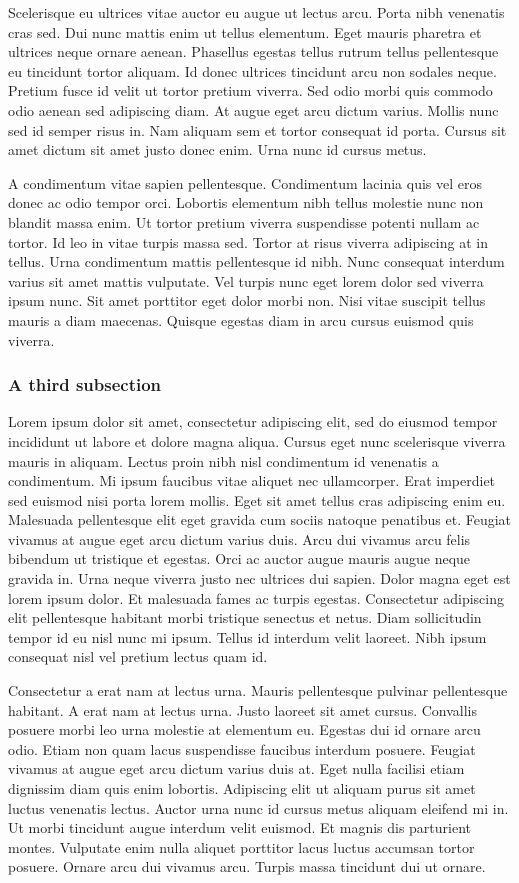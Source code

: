 \documentclass[red, openany, logo-1e]{shadowrun}
\begin{document}
Scelerisque eu ultrices vitae auctor eu augue ut lectus arcu. Porta nibh venenatis cras sed. Dui nunc mattis enim ut tellus elementum. Eget mauris pharetra et ultrices neque ornare aenean. Phasellus egestas tellus rutrum tellus pellentesque eu tincidunt tortor aliquam. Id donec ultrices tincidunt arcu non sodales neque. Pretium fusce id velit ut tortor pretium viverra. Sed odio morbi quis commodo odio aenean sed adipiscing diam. At augue eget arcu dictum varius. Mollis nunc sed id semper risus in. Nam aliquam sem et tortor consequat id porta. Cursus sit amet dictum sit amet justo donec enim. Urna nunc id cursus metus.

A condimentum vitae sapien pellentesque. Condimentum lacinia quis vel eros donec ac odio tempor orci. Lobortis elementum nibh tellus molestie nunc non blandit massa enim. Ut tortor pretium viverra suspendisse potenti nullam ac tortor. Id leo in vitae turpis massa sed. Tortor at risus viverra adipiscing at in tellus. Urna condimentum mattis pellentesque id nibh. Nunc consequat interdum varius sit amet mattis vulputate. Vel turpis nunc eget lorem dolor sed viverra ipsum nunc. Sit amet porttitor eget dolor morbi non. Nisi vitae suscipit tellus mauris a diam maecenas. Quisque egestas diam in arcu cursus euismod quis viverra.

\subsubsection{A third subsection}
Lorem ipsum dolor sit amet, consectetur adipiscing elit, sed do eiusmod tempor incididunt ut labore et dolore magna aliqua. Cursus eget nunc scelerisque viverra mauris in aliquam. Lectus proin nibh nisl condimentum id venenatis a condimentum. Mi ipsum faucibus vitae aliquet nec ullamcorper. Erat imperdiet sed euismod nisi porta lorem mollis. Eget sit amet tellus cras adipiscing enim eu. Malesuada pellentesque elit eget gravida cum sociis natoque penatibus et. Feugiat vivamus at augue eget arcu dictum varius duis. Arcu dui vivamus arcu felis bibendum ut tristique et egestas. Orci ac auctor augue mauris augue neque gravida in. Urna neque viverra justo nec ultrices dui sapien. Dolor magna eget est lorem ipsum dolor. Et malesuada fames ac turpis egestas. Consectetur adipiscing elit pellentesque habitant morbi tristique senectus et netus. Diam sollicitudin tempor id eu nisl nunc mi ipsum. Tellus id interdum velit laoreet. Nibh ipsum consequat nisl vel pretium lectus quam id.

Consectetur a erat nam at lectus urna. Mauris pellentesque pulvinar pellentesque habitant. A erat nam at lectus urna. Justo laoreet sit amet cursus. Convallis posuere morbi leo urna molestie at elementum eu. Egestas dui id ornare arcu odio. Etiam non quam lacus suspendisse faucibus interdum posuere. Feugiat vivamus at augue eget arcu dictum varius duis at. Eget nulla facilisi etiam dignissim diam quis enim lobortis. Adipiscing elit ut aliquam purus sit amet luctus venenatis lectus. Auctor urna nunc id cursus metus aliquam eleifend mi in. Ut morbi tincidunt augue interdum velit euismod. Et magnis dis parturient montes. Vulputate enim nulla aliquet porttitor lacus luctus accumsan tortor posuere. Ornare arcu dui vivamus arcu. Turpis massa tincidunt dui ut ornare.
\end{document}
